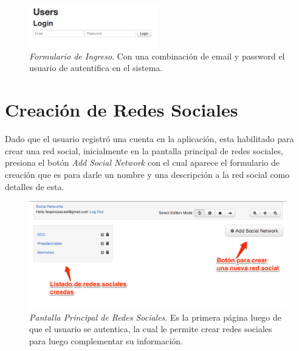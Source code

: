 \begin{figure}[H]
  \centering
  \includegraphics[width=0.5\textwidth]{images/login.png}
  \caption[Formulario de Ingreso]{\emph{Formulario de Ingreso}. Con una combinación de email y password el usuario de autentifica en el sistema.}
  \label{login}
\end{figure}


\section{Creación de Redes Sociales} %
\label{sec:creacion_de_redes_sociales}

Dado que el usuario registró una cuenta en la aplicación, esta habilitado para crear una red social, inicialmente en la pantalla principal de redes sociales, presiona el botón \emph{Add Social Network} con el cual aparece el formulario de creación que es para darle un nombre y una descripción a la red social como detalles de esta.

\begin{figure}[H]
  \centering
  \includegraphics[width=1.0\textwidth]{images/principal_social_networks.png}
  \caption[Pantalla Principal de Redes Sociales]{\emph{Pantalla Principal de Redes Sociales}. Es la primera página luego de que el usuario se autentica, la cual le permite crear redes sociales para luego complementar su información.}
  \label{principal_social_network}
\end{figure}

